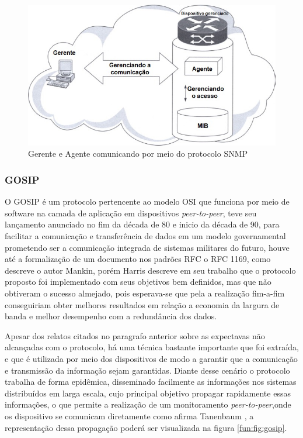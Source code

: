 \begin{figure}[H]
	\begin{center}
	\includegraphics[scale = 0.70]{img/SNMP-Execution.jpg}
		\caption{Gerente e Agente comunicando por meio do protocolo SNMP\cite{nadeau2003mpls}}
		\label{fun:fig:snmpexecution}
	\end{center}
\end{figure}


\subsubsection{GOSIP}

O \acrshort{GOSIP} é um protocolo pertencente ao modelo \acrshort{OSI} que funciona por meio de software na camada de aplicação em dispositivos \textit{peer-to-peer}, teve seu lançamento anunciado no fim da década de 80 e inicio da década de 90, para facilitar a comunicação e transferência de dados em um modelo governamental prometendo ser a comunicação integrada de sistemas militares do futuro, houve até a formalização de um documento nos padrões \acrshort{RFC} o RFC 1169, como descreve o autor Mankin\cite{mankin1991towards}, porém Harris\cite{harris1992tactical} descreve em seu trabalho que o protocolo proposto foi implementado com seus objetivos bem definidos, mas que não obtiveram o sucesso almejado, pois esperava-se que pela a realização fim-a-fim conseguiriam obter melhores resultados em relação a economia da largura de banda e melhor desempenho com a redundância dos dados.

Apesar dos relatos citados no paragrafo anterior sobre as expectavas não alcançadas com o protocolo, há uma técnica bastante importante que foi extraída, e que é utilizada por meio dos dispositivos de modo a garantir que a comunicação e transmissão da informação sejam garantidas. Diante desse cenário o protocolo trabalha de forma epidêmica, disseminado facilmente as informações nos sistemas distribuídos em larga escala, cujo principal objetivo propagar rapidamente essas informações, o que permite a realização de um monitoramento \textit{peer-to-peer},onde os dispositivo se comunicam diretamente como afirma Tanenbaum \cite{tanenbaum2007distributed}, a representação dessa propagação poderá ser visualizada na figura \ref{fun:fig:gosip}. 

